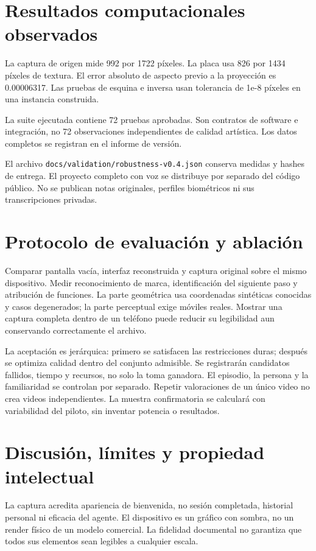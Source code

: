 \documentclass[10pt,a4paper]{article}
\begin{document}
\section{Resultados computacionales observados}
La captura de origen mide 992 por 1722 píxeles. La placa usa 826 por 1434 píxeles de textura. El error absoluto de aspecto previo a la proyección es 0.00006317. Las pruebas de esquina e inversa usan tolerancia de 1e-8 píxeles en una instancia construida.

La suite ejecutada contiene 72 pruebas aprobadas. Son contratos de software e integración, no 72 observaciones independientes de calidad artística. Los datos completos se registran en el informe de versión.

El archivo \texttt{docs/validation/robustness-v0.4.json} conserva medidas y hashes de entrega. El proyecto completo con voz se distribuye por separado del código público. No se publican notas originales, perfiles biométricos ni sus transcripciones privadas.
\section{Protocolo de evaluación y ablación}
Comparar pantalla vacía, interfaz reconstruida y captura original sobre el mismo dispositivo. Medir reconocimiento de marca, identificación del siguiente paso y atribución de funciones. La parte geométrica usa coordenadas sintéticas conocidas y casos degenerados; la parte perceptual exige móviles reales. Mostrar una captura completa dentro de un teléfono puede reducir su legibilidad aun conservando correctamente el archivo.

La aceptación es jerárquica: primero se satisfacen las restricciones duras; después se optimiza calidad dentro del conjunto admisible. Se registrarán candidatos fallidos, tiempo y recursos, no solo la toma ganadora. El episodio, la persona y la familiaridad se controlan por separado. Repetir valoraciones de un único video no crea videos independientes. La muestra confirmatoria se calculará con variabilidad del piloto, sin inventar potencia o resultados.
\section{Discusión, límites y propiedad intelectual}
La captura acredita apariencia de bienvenida, no sesión completada, historial personal ni eficacia del agente. El dispositivo es un gráfico con sombra, no un render físico de un modelo comercial. La fidelidad documental no garantiza que todos sus elementos sean legibles a cualquier escala.
\end{document}
